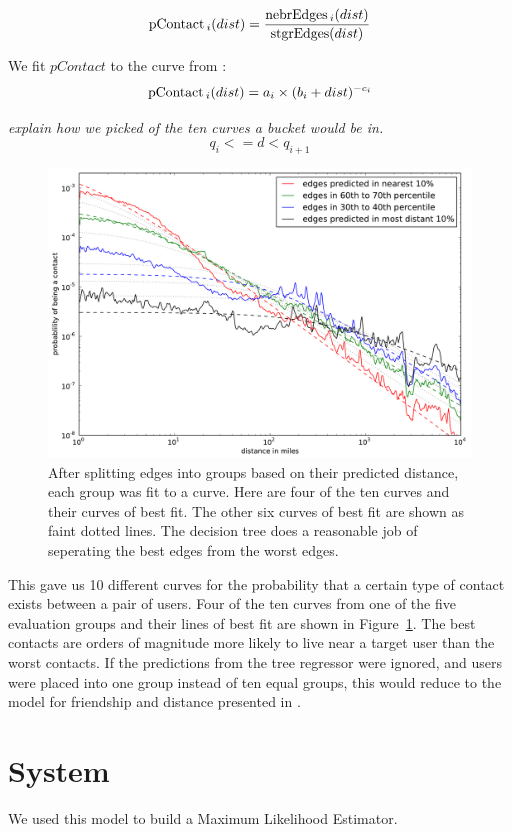 \[
\operatorname{pContact}{_i}(dist) = \frac{\operatorname{nebrEdges}{_i}(dist)}{\operatorname{stgrEdges}(dist)}
\]

We fit $pContact$ to the curve from \cite{backstrom2010find}:
\[
    \operatorname{pContact}{_i}(dist) = a_{i} \times (b_{i}+dist)^{-c_{i}}
\]

\emph{explain how we picked of the ten curves a bucket would be in.}
\[
    q_i<=d<q_{i+1}
\]

\begin{figure}[tbh]
\centering
\includegraphics[width=\linewidth]{figures/near_prob_fit.pdf}
\caption{
After splitting edges into groups based on their predicted distance, each group
was fit to a curve. Here are four of the ten curves and their curves of best
fit. The other six curves of best fit are shown as faint dotted lines. The
decision tree does a reasonable job of seperating the best edges from the worst
edges.
}
\label{fig:NearProbFit}
\end{figure}

This gave us 10 different curves for the probability that a certain type of
contact exists between a pair of users.
%
Four of the ten curves from one of the five evaluation groups and their lines
of best fit are shown in Figure~\ref{fig:NearProbFit}.
%
The best contacts are orders of magnitude more
likely to live near a target user than the worst contacts.
%
If the predictions from the tree regressor were ignored, and users were placed
into one group instead of ten equal groups, this would reduce to the model
for friendship and distance presented in \cite{backstrom2010find}.


\section{System}
We used this model to build a Maximum Likelihood Estimator.

